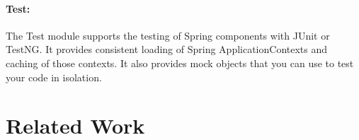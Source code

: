 \paragraph{Test:} The Test module supports the testing of Spring components with JUnit or TestNG. It provides consistent
loading of Spring ApplicationContexts and caching of those contexts. It also provides mock objects that
you can use to test your code in isolation.




\section{Related Work\label{sec:back_rel_work}}